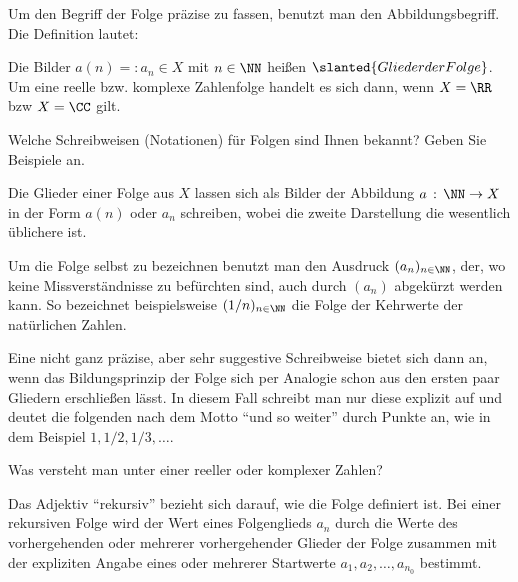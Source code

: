 \begin{antwort}
  Um den Begriff der Folge präzise zu fassen, 
  benutzt man den Abbildungsbegriff. Die Definition lautet: 

  \medskip\noindent

  \medskip\noindent
  Die Bilder $a(n)=:a_n \in X$ mit $n\in \NN$
  heißen $\slanted{Glieder der Folge}$.
  Um eine reelle bzw. komplexe Zahlenfolge handelt es sich dann, wenn 
  $X=\RR$ bzw 
  $X=\CC$ gilt. \AntEnd
\end{antwort}


\begin{frage}%
  \label{02_fnot}
  Welche Schreibweisen (Notationen) für Folgen sind Ihnen bekannt? 
  Geben Sie Beispiele an.
\end{frage}

\begin{antwort}
  Die Glieder einer Folge aus $X$ lassen sich als Bilder der 
  Abbildung $a\,:\, \NN \to X$ in der Form $a(n)$ oder $a_n$ schreiben, wobei 
  die zweite Darstellung die wesentlich üblichere ist. 

  Um die Folge selbst zu bezeichnen benutzt man den Ausdruck $(a_n)_{n\in\NN}$, 
  der, wo keine Missverständnisse zu befürchten sind, auch durch $(a_n)$ 
  abgekürzt werden kann. So bezeichnet beispielsweise $(1/n)_{n\in\NN}$ die 
  Folge der Kehrwerte der natürlichen Zahlen.

  Eine nicht ganz präzise, aber sehr suggestive Schreibweise 
  bietet sich dann an, wenn das Bildungsprinzip der Folge sich per Analogie 
  schon aus den ersten paar Gliedern erschließen lässt. In diesem Fall schreibt 
  man nur diese explizit auf und deutet die folgenden nach dem Motto 
  "`und so weiter"' durch Punkte an, wie in dem Beispiel $1,1/2,1/3,\ldots$. 
  \AntEnd
\end{antwort}

\begin{frage}%
  \label{02_frek}
  Was versteht man unter einer  reeller oder 
  komplexer Zahlen?
\end{frage}

\begin{antwort}
  Das Adjektiv "`rekursiv"' bezieht sich darauf, wie die Folge definiert ist. 
  Bei einer rekursiven Folge wird der Wert eines 
  Folgenglieds $a_n$ durch die Werte des vorhergehenden oder 
  mehrerer vorhergehender Glieder der Folge zusammen mit der 
  expliziten Angabe eines oder mehrerer Startwerte $a_1, a_2, \ldots, a_{n_0}$ 
  bestimmt. 
  \AntEnd
\end{antwort}

